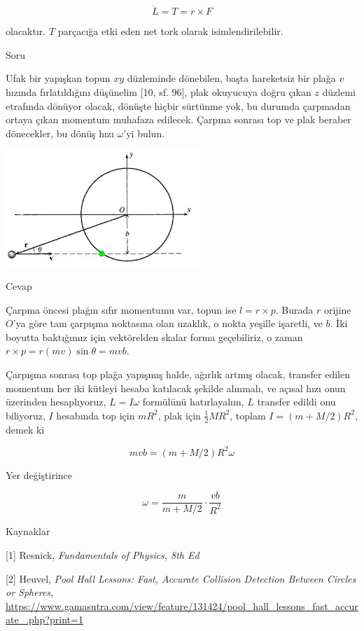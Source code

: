 \documentclass[12pt,fleqn]{article}\usepackage{../../common}
\begin{document}
$$
\dot{L} = T = r \times F
$$

olacaktır. $T$ parçacığa etki eden net tork olarak isimlendirilebilir.

Soru

Ufak bir yapışkan topun $xy$ düzleminde dönebilen, başta hareketsiz bir plağa
$v$ hızında fırlatıldığını düşünelim [10, sf. 96], plak okuyucuya doğru çıkan
$z$ düzlemi etrafında dönüyor olacak, dönüşte hiçbir sürtünme yok, bu durumda
çarpmadan ortaya çıkan momentum muhafaza edilecek. Çarpma sonrası top ve plak
beraber dönecekler, bu dönüş hızı $\omega$'yi bulun.

\includegraphics[width=20em]{phy_005_basics_02_17.jpg}

Cevap

Çarpma öncesi plağın sıfır momentumu var, topun ise $l = r \times p$. Burada $r$
orijine $O$'ya göre tam çarpışma noktasına olan uzaklık, o nokta yeşille
işaretli, ve $b$. İki boyutta baktığımız için vektörelden skalar forma
geçebiliriz, o zaman $r \times p = r (mv) \sin \theta = m v b$.

Çarpışma sonrası top plağa yapışmış halde, ağırlık artmış olacak, transfer
edilen momentum her iki kütleyi hesaba katılacak şekilde alınmalı, ve açısal
hızı onun üzerinden hesaplıyoruz, $L = I \omega$ formülünü hatırlayalım, $L$
transfer edildi onu biliyoruz, $I$ hesabında top için $mR^2$, plak için
$\frac{1}{2} M R^2$, toplam $I = (m+M/2) R^2$, demek ki

$$
m v b = (m + M/2) R^2 \omega
$$

Yer değiştirince

$$
\omega = \frac{m}{m + M/2} \cdot \frac{vb}{R^2}
$$



Kaynaklar

[1] Resnick, {\em Fundamentals of Physics, 8th Ed}

[2] Heuvel, {\em Pool Hall Lessons: Fast, Accurate Collision Detection Between Circles or Spheres},
    \url{https://www.gamasutra.com/view/feature/131424/pool_hall_lessons_fast_accurate_.php?print=1}
\end{document}
